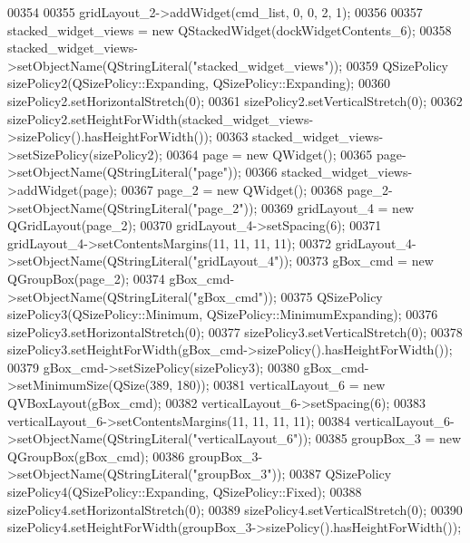\begin{DoxyCode}
00354 
00355         gridLayout\_2->addWidget(cmd\_list, 0, 0, 2, 1);
00356 
00357         stacked\_widget\_views = \textcolor{keyword}{new} QStackedWidget(dockWidgetContents\_6);
00358         stacked\_widget\_views->setObjectName(QStringLiteral(\textcolor{stringliteral}{"stacked\_widget\_views"}));
00359         QSizePolicy sizePolicy2(QSizePolicy::Expanding, QSizePolicy::Expanding);
00360         sizePolicy2.setHorizontalStretch(0);
00361         sizePolicy2.setVerticalStretch(0);
00362         sizePolicy2.setHeightForWidth(stacked\_widget\_views->sizePolicy().hasHeightForWidth());
00363         stacked\_widget\_views->setSizePolicy(sizePolicy2);
00364         page = \textcolor{keyword}{new} QWidget();
00365         page->setObjectName(QStringLiteral(\textcolor{stringliteral}{"page"}));
00366         stacked\_widget\_views->addWidget(page);
00367         page\_2 = \textcolor{keyword}{new} QWidget();
00368         page\_2->setObjectName(QStringLiteral(\textcolor{stringliteral}{"page\_2"}));
00369         gridLayout\_4 = \textcolor{keyword}{new} QGridLayout(page\_2);
00370         gridLayout\_4->setSpacing(6);
00371         gridLayout\_4->setContentsMargins(11, 11, 11, 11);
00372         gridLayout\_4->setObjectName(QStringLiteral(\textcolor{stringliteral}{"gridLayout\_4"}));
00373         gBox\_cmd = \textcolor{keyword}{new} QGroupBox(page\_2);
00374         gBox\_cmd->setObjectName(QStringLiteral(\textcolor{stringliteral}{"gBox\_cmd"}));
00375         QSizePolicy sizePolicy3(QSizePolicy::Minimum, QSizePolicy::MinimumExpanding);
00376         sizePolicy3.setHorizontalStretch(0);
00377         sizePolicy3.setVerticalStretch(0);
00378         sizePolicy3.setHeightForWidth(gBox\_cmd->sizePolicy().hasHeightForWidth());
00379         gBox\_cmd->setSizePolicy(sizePolicy3);
00380         gBox\_cmd->setMinimumSize(QSize(389, 180));
00381         verticalLayout\_6 = \textcolor{keyword}{new} QVBoxLayout(gBox\_cmd);
00382         verticalLayout\_6->setSpacing(6);
00383         verticalLayout\_6->setContentsMargins(11, 11, 11, 11);
00384         verticalLayout\_6->setObjectName(QStringLiteral(\textcolor{stringliteral}{"verticalLayout\_6"}));
00385         groupBox\_3 = \textcolor{keyword}{new} QGroupBox(gBox\_cmd);
00386         groupBox\_3->setObjectName(QStringLiteral(\textcolor{stringliteral}{"groupBox\_3"}));
00387         QSizePolicy sizePolicy4(QSizePolicy::Expanding, QSizePolicy::Fixed);
00388         sizePolicy4.setHorizontalStretch(0);
00389         sizePolicy4.setVerticalStretch(0);
00390         sizePolicy4.setHeightForWidth(groupBox\_3->sizePolicy().hasHeightForWidth());

\end{DoxyCode}
